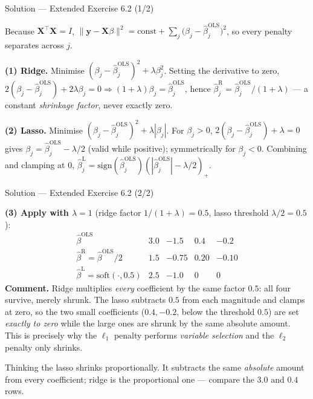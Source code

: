 \documentclass[aspectratio=169,11pt]{beamer}
\begin{document}
\begin{frame}{Solution --- Extended Exercise 6.2 (1/2)}
  \begin{solutionbox}
    Because $\mathbf{X}^\top\mathbf{X}=I$,
    $\lVert\mathbf{y}-\mathbf{X}\beta\rVert^2=\text{const}
    +\sum_j\bigl(\beta_j-\hat\beta_j^{\mathrm{OLS}}\bigr)^2$, so every
    penalty separates across $j$.

    \textbf{(1) Ridge.} Minimise
    $(\beta_j-\hat\beta_j^{\mathrm{OLS}})^2+\lambda\beta_j^2$. Setting the
    derivative to zero,
    $2(\beta_j-\hat\beta_j^{\mathrm{OLS}})+2\lambda\beta_j=0
    \Rightarrow(1+\lambda)\beta_j=\hat\beta_j^{\mathrm{OLS}}$, hence
    $\boxed{\hat\beta_j^{\mathrm R}=\hat\beta_j^{\mathrm{OLS}}/(1+\lambda)}$
    --- a constant \emph{shrinkage factor}, never exactly zero.

    \textbf{(2) Lasso.} Minimise
    $(\beta_j-\hat\beta_j^{\mathrm{OLS}})^2+\lambda|\beta_j|$. For
    $\beta_j>0$, $2(\beta_j-\hat\beta_j^{\mathrm{OLS}})+\lambda=0$ gives
    $\beta_j=\hat\beta_j^{\mathrm{OLS}}-\lambda/2$ (valid while
    positive); symmetrically for $\beta_j<0$. Combining and clamping at
    $0$,
    $\boxed{\hat\beta_j^{\mathrm L}
    =\mathrm{sign}(\hat\beta_j^{\mathrm{OLS}})
    (|\hat\beta_j^{\mathrm{OLS}}|-\lambda/2)_+}$.
  \end{solutionbox}
\end{frame}

\begin{frame}{Solution --- Extended Exercise 6.2 (2/2)}
  \begin{solutionbox}
    \textbf{(3) Apply with $\lambda=1$} (ridge factor $1/(1+\lambda)=0.5$,
    lasso threshold $\lambda/2=0.5$):
    \[
      \begin{array}{c|cccc}
        \hat\beta^{\mathrm{OLS}} & 3.0 & -1.5 & 0.4 & -0.2\\\hline
        \hat\beta^{\mathrm R}=\hat\beta^{\mathrm{OLS}}/2 & 1.5 & -0.75 & 0.20 & -0.10\\[1pt]
        \hat\beta^{\mathrm L}=\mathrm{soft}(\cdot,0.5) & 2.5 & -1.0 & 0 & 0
      \end{array}
    \]
    \textbf{Comment.} Ridge multiplies \emph{every} coefficient by the
    same factor $0.5$: all four survive, merely shrunk. The lasso
    subtracts $0.5$ from each magnitude and clamps at zero, so the two
    small coefficients ($0.4,-0.2$, below the threshold $0.5$) are set
    \emph{exactly to zero} while the large ones are shrunk by the same
    absolute amount. This is precisely why the $\ell_1$ penalty performs
    \emph{variable selection} and the $\ell_2$ penalty only shrinks.
  \end{solutionbox}
  \begin{mistake}
    Thinking the lasso shrinks proportionally. It subtracts the same
    \emph{absolute} amount from every coefficient; ridge is the
    proportional one --- compare the $3.0$ and $0.4$ rows.
  \end{mistake}
\end{frame}
\end{document}
